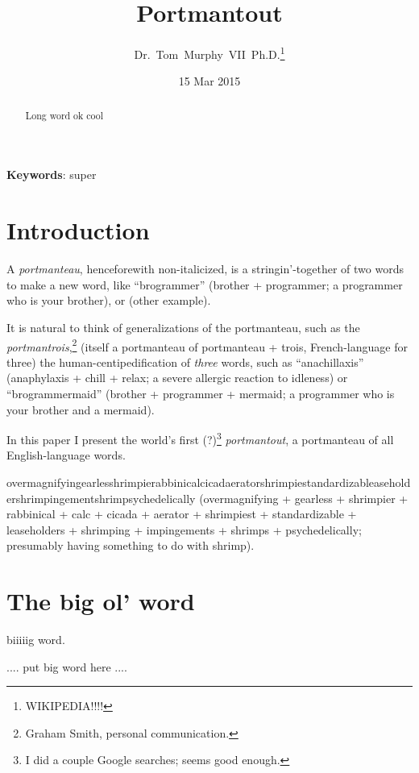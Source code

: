 \documentclass{article}
\begin{document}
 

\title{Portmantout}
\author{Dr.~Tom~Murphy~VII~Ph.D.\thanks{
WIKIPEDIA!!!!
}
}

\renewcommand\>{$>$}
\newcommand\<{$<$}

\date{15 Mar 2015}

\maketitle

\begin{abstract}
Long word ok cool
\end{abstract}

\vspace{1em}
{\noindent \small {\bf Keywords}:
 super
}

\newcommand\foo[1]{%
  \begin{minipage}{7.6in}
  \seqsplit{#1}
  \end{minipage}
  }

\section{Introduction}

A {\em portmanteau}, henceforewith non-italicized, is a
stringin'-together of two words to make a new word, like
``brogrammer'' ({\sf brother} + {\sf programmer}; a programmer who is
your brother), or (other example).

It is natural to think of generalizations of the portmanteau, such as
the {\em portmantrois},\!\footnote{Graham Smith, personal
  communication.} (itself a portmanteau of {\sf portmanteau} + {\sf
  trois}, French-language for three) the human-centipedification of
{\em three} words, such as ``anachillaxis'' ({\sf anaphylaxis} + {\sf
  chill} + {\sf relax}; a severe allergic reaction to idleness) or
``brogrammermaid'' ({\sf brother} + {\sf programmer} + {\sf mermaid};
a programmer who is your brother and a mermaid).

In this paper I present the world's first (?)\footnote{I did a couple
  Google searches; seems good enough.} {\em portmantout}, a
portmanteau of all English-language words. 

overmagnifyingearlesshrimpierabbinicalcicadaeratorshrimpiestandardizableaseholdershrimpingementshrimpsychedelically ({\sf overmagnifying} + {\sf gearless} + {\sf shrimpier} + {\sf rabbinical} + {\sf calc} + {\sf cicada} + {\sf aerator} + {\sf shrimpiest} + {\sf standardizable} + {\sf leaseholders} + {\sf shrimping} + {\sf impingements} + {\sf shrimps} + {\sf psychedelically}; presumably having something to do with shrimp).


\section{The big ol' word}
\tiny
{}
biiiiig word.

.... put big word here ....
\end{document}
